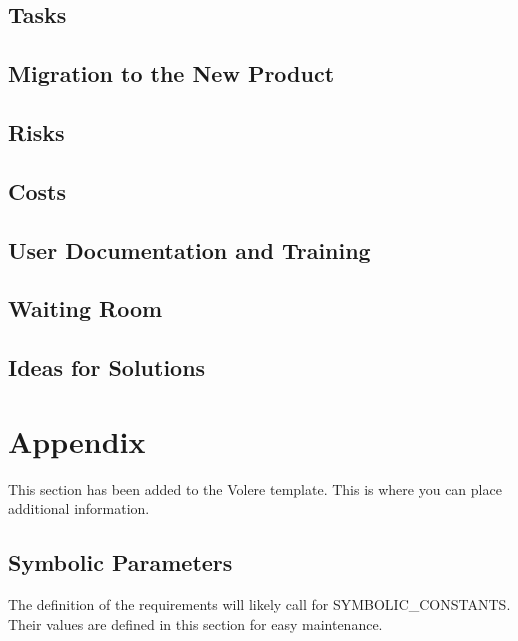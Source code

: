 \documentclass[12pt, titlepage]{article}
\begin{document}
\subsection{Tasks}

\subsection{Migration to the New Product}

\subsection{Risks}

\subsection{Costs}

\subsection{User Documentation and Training}

\subsection{Waiting Room}

\subsection{Ideas for Solutions}





\newpage

\section{Appendix}

This section has been added to the Volere template.  This is where you can place
additional information.

\subsection{Symbolic Parameters}

The definition of the requirements will likely call for SYMBOLIC\_CONSTANTS.
Their values are defined in this section for easy maintenance.
\end{document}
